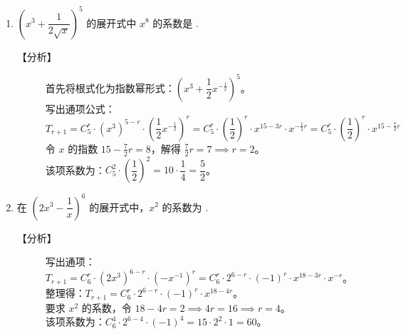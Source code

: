 \documentclass[11pt,a4paper]{article}
\newlength{\myspace}             %
\begin{document}
\newpage

\begin{enumerate}[label=\arabic*., start=4, leftmargin=1.5em]

    \item $\left( x^3 + \dfrac{1}{2\sqrt{x}} \right)^5$ 的展开式中 $x^8$ 的系数是 \underline{\hspace{2cm}}. 
    
    \begin{description}
        \item[【分析】] 
        首先将根式化为指数幂形式：$\left( x^3 + \dfrac{1}{2}x^{-\frac{1}{2}} \right)^5$。\\
        写出通项公式：
        \[ T_{r+1} = C_5^r \cdot (x^3)^{5-r} \cdot \left( \frac{1}{2}x^{-\frac{1}{2}} \right)^r = C_5^r \cdot \left( \frac{1}{2} \right)^r \cdot x^{15-3r} \cdot x^{-\frac{1}{2}r} = C_5^r \cdot \left( \frac{1}{2} \right)^r \cdot x^{15 - \frac{7}{2}r} \]
        令 $x$ 的指数 $15 - \frac{7}{2}r = 8$，解得 $\frac{7}{2}r = 7 \implies r = 2$。\\
        该项系数为：$C_5^2 \cdot \left( \dfrac{1}{2} \right)^2 = 10 \cdot \dfrac{1}{4} = \dfrac{5}{2}$。
    \end{description}

    \vspace{\myspace}

    \item 在 $\left( 2x^3 - \dfrac{1}{x} \right)^6$ 的展开式中，$x^2$ 的系数为 \underline{\hspace{2cm}}.
    
    \begin{description}
        \item[【分析】] 
        写出通项：$T_{r+1} = C_6^r \cdot (2x^3)^{6-r} \cdot \left( -x^{-1} \right)^r = C_6^r \cdot 2^{6-r} \cdot (-1)^r \cdot x^{18-3r} \cdot x^{-r}$。\\
        整理得：$T_{r+1} = C_6^r \cdot 2^{6-r} \cdot (-1)^r \cdot x^{18-4r}$。\\
        要求 $x^2$ 的系数，令 $18-4r = 2 \implies 4r = 16 \implies r = 4$。\\
        该项系数为：$C_6^4 \cdot 2^{6-4} \cdot (-1)^4 = 15 \cdot 2^2 \cdot 1 = 60$。
    \end{description}

\end{enumerate}

\vspace{\myspace}
\end{document}
